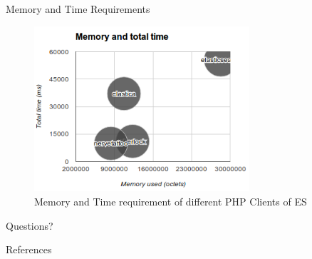 \documentclass[10pt]{beamer}
\begin{document}
\begin{frame}{Memory and Time Requirements}
	\begin{figure}
		\centering\includegraphics[width=8cm]{clients_memory}
		\caption{Memory and Time requirement of different PHP Clients of ES}
	\end{figure}
\end{frame}

\begin{frame}[standout]
  Questions?
\end{frame}

\begin{frame}[allowframebreaks]{References}

  
  

\end{frame}
\end{document}
